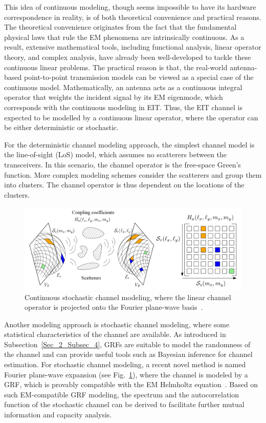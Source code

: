 \documentclass[journal,twocolumn]{IEEEtran}
\begin{document}
This idea of continuous modeling, though seems impossible to have its hardware correspondence in reality, is of both theoretical convenience and practical reasons. 
The theoretical convenience originates from the fact that the fundamental physical laws that rule the EM phenomena are intrinsically continuous. 
As a result, extensive mathematical tools, including functional analysis, linear operator theory, and complex analysis, have already been well-developed to tackle these continuous linear problems. 
The practical reason is that, the real-world antenna-based point-to-point transmission models can be viewed as a special case of the continuous model. 
Mathematically, an antenna acts as a continuous integral operator that weights the incident signal by its EM eigenmode, which corresponds with the continuous modeling in EIT. 
Thus, the EIT channel is expected to be modelled by a continuous linear operator, where the operator can be either deterministic or stochastic.

For the deterministic channel modeling approach, the simplest channel model is the line-of-sight (LoS) model, which assumes no scatterers between the transceivers. In this scenario, the channel operator is the free-space Green's function. More complex modeling schemes consider the scatterers and group them into clusters. The channel operator is thus dependent on the locations of the clusters.

\begin{figure}
	\centering 
	\includegraphics[width=\linewidth]{figures/random_channel-new.png} 
	\caption{Continuous stochastic channel modeling, where the linear channel operator is projected onto the Fourier plane-wave basis~\cite{marzetta2022fourier}.} 
	\label{fig:marzetta}
\end{figure}
Another modeling approach is stochastic channel modeling, where some statistical characteristics of the channel are available. As introduced in Subsection~\ref{Sec_2_Subsec_4}, GRFs are suitable to model the randomness of the channel and can provide useful tools such as Bayesian inference for channel estimation. 
For stochastic channel modeling, a recent novel method is named Fourier plane-wave expansion (see Fig.~\ref{fig:marzetta}), where the channel is modeled by a GRF, which is provably compatible with the EM Helmholtz equation~\cite{marzetta2022fourier}. 
Based on such EM-compatible GRF modeling, the spectrum and the autocorrelation function of the stochastic channel can be derived to facilitate further mutual information and capacity analysis.
\end{document}
